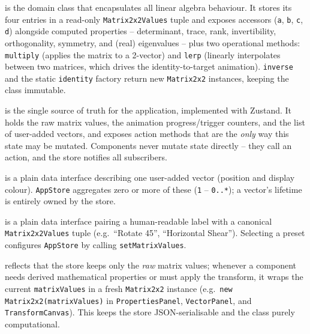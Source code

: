 \documentclass[11pt,a4paper]{article}
\begin{document}
\begin{description}[leftmargin=1.4em, style=nextline]
  \item[\texttt{Matrix2x2}] is the domain class that encapsulates all linear
    algebra behaviour. It stores its four entries in a read-only
    \texttt{Matrix2x2Values} tuple and exposes accessors (\texttt{a}, \texttt{b},
    \texttt{c}, \texttt{d}) alongside computed properties -- determinant, trace,
    rank, invertibility, orthogonality, symmetry, and (real) eigenvalues -- plus
    two operational methods: \texttt{multiply} (applies the matrix to a
    2-vector) and \texttt{lerp} (linearly interpolates between two matrices,
    which drives the identity-to-target animation). \texttt{inverse} and the
    static \texttt{identity} factory return new \texttt{Matrix2x2} instances,
    keeping the class immutable.

  \item[\texttt{AppStore}] is the single source of truth for the application,
    implemented with Zustand. It holds the raw matrix values, the animation
    progress/trigger counters, and the list of user-added vectors, and exposes
    action methods that are the \emph{only} way this state may be mutated.
    Components never mutate state directly -- they call an action, and the
    store notifies all subscribers.

  \item[\texttt{CustomVector}] is a plain data interface describing one
    user-added vector (position and display colour). \texttt{AppStore}
    aggregates zero or more of these (\texttt{1} -- \texttt{0..*}); a vector's
    lifetime is entirely owned by the store.

  \item[\texttt{Preset}] is a plain data interface pairing a human-readable
    label with a canonical \texttt{Matrix2x2Values} tuple (e.g.\ ``Rotate
    45\textdegree'', ``Horizontal Shear''). Selecting a preset configures
    \texttt{AppStore} by calling \texttt{setMatrixValues}.

  \item[Dependency \texttt{AppStore} $\dashrightarrow$ \texttt{Matrix2x2}]
    reflects that the store keeps only the \emph{raw} matrix values; whenever a
    component needs derived mathematical properties or must apply the
    transform, it wraps the current \texttt{matrixValues} in a fresh
    \texttt{Matrix2x2} instance (e.g.\ \texttt{new Matrix2x2(matrixValues)} in
    \texttt{PropertiesPanel}, \texttt{VectorPanel}, and \texttt{TransformCanvas}).
    This keeps the store JSON-serialisable and the class purely computational.
\end{description}
\end{document}
